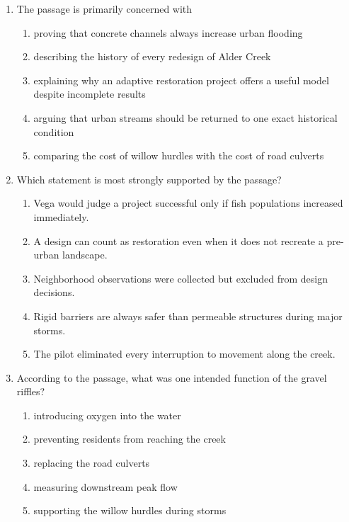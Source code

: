 \begin{enumerate}
\item The passage is primarily concerned with
\begin{enumerate}
\item proving that concrete channels always increase urban flooding
\item describing the history of every redesign of Alder Creek
\item explaining why an adaptive restoration project offers a useful model despite incomplete results
\item arguing that urban streams should be returned to one exact historical condition
\item comparing the cost of willow hurdles with the cost of road culverts
\end{enumerate}

\item Which statement is most strongly supported by the passage?
\begin{enumerate}
\item Vega would judge a project successful only if fish populations increased immediately.
\item A design can count as restoration even when it does not recreate a pre-urban landscape.
\item Neighborhood observations were collected but excluded from design decisions.
\item Rigid barriers are always safer than permeable structures during major storms.
\item The pilot eliminated every interruption to movement along the creek.
\end{enumerate}

\item According to the passage, what was one intended function of the gravel riffles?
\begin{enumerate}
\item introducing oxygen into the water
\item preventing residents from reaching the creek
\item replacing the road culverts
\item measuring downstream peak flow
\item supporting the willow hurdles during storms
\end{enumerate}


\end{enumerate}
